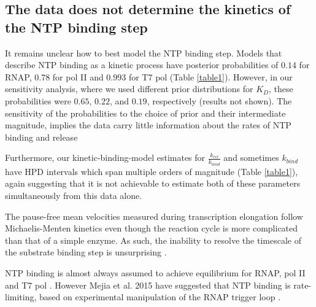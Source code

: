 \documentclass[10pt,letterpaper]{article}
\begin{document}
\subsection*{The data does not determine the kinetics of the NTP binding step} 

It remains unclear how to best model the NTP binding step. Models that describe NTP binding as a kinetic process have posterior probabilities of $0.14$ for RNAP, $0.78$ for pol II and $0.993$ for T7 pol (Table \ref{table1}). 
However, in our sensitivity analysis, where we used different prior distributions for $K_D$, these probabilities were $0.65$, $0.22$, and $0.19$, respectively (results not shown). 
The sensitivity of the probabilities to the choice of prior and their intermediate magnitude, implies the data carry little information about the rates of NTP binding and release


Furthermore, our kinetic-binding-model estimates for $\frac{k_{rel}}{k_{bind}}$ and sometimes $k_{bind}$ have HPD intervals which span multiple orders of magnitude (Table \ref{table1}), again suggesting that it is not achievable to estimate both of these parameters simultaneously from this data alone. 

The pause-free mean velocities measured during transcription elongation follow Michaelis-Menten kinetics 
\cite{wong2018structural} even though the reaction cycle is more complicated than that of a simple enzyme. As such, the inability to resolve the timescale of the substrate binding step is unsurprising \cite{briggs1925note, english2006ever, schnell2014validity}.



NTP binding is almost always assumed to achieve equilibrium for RNAP, pol II and T7 pol \cite{maoileidigh2011unified, tadigotla2006thermodynamic, bai2004sequence, abbondanzieri2005direct, larson2012trigger, schweikhard2014transcription, Dangkulwanich2013complete, arnold2001kinetic, thomen2008t7, thomen2005unravelling}. However Mejia et al. 2015 have suggested that NTP binding is rate-limiting, based on experimental manipulation of the RNAP trigger loop \cite{mejia2015trigger} . \par   
\end{document}
